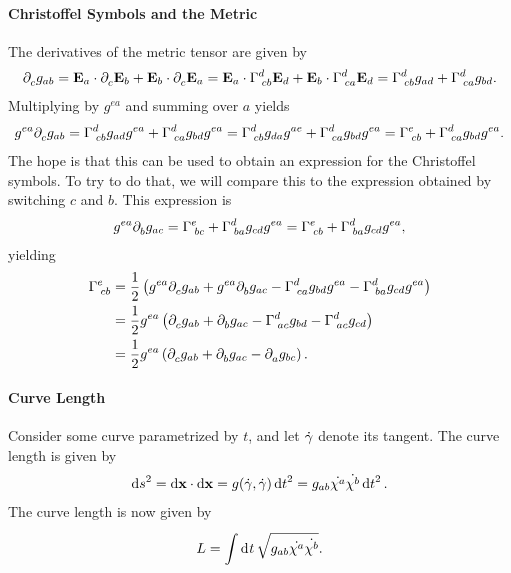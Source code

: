 \paragraph{Christoffel Symbols and the Metric}
The derivatives of the metric tensor are given by
\begin{align*}
	\partial^{}_{c}g_{ab} = \vb{E}_{a}\cdot\partial^{}_{c}\vb{E}_{b} + \vb{E}_{b}\cdot\partial^{}_{c}\vb{E}_{a} = \vb{E}_{a}\cdot\Gamma^{d}_{\;cb}\vb{E}_{d} + \vb{E}_{b}\cdot\Gamma^{d}_{\;ca}\vb{E}_{d} = \Gamma^{d}_{\;cb}g_{ad} + \Gamma^{d}_{\;ca}g_{bd}.
\end{align*}
Multiplying by $g^{ea}$ and summing over $a$ yields
\begin{align*}
	g^{ea}\partial^{}_{c}g_{ab} = \Gamma^{d}_{\;cb}g_{ad}g^{ea} + \Gamma^{d}_{\;ca}g_{bd}g^{ea} = \Gamma^{d}_{\;cb}g_{da}g^{ae} + \Gamma^{d}_{\;ca}g_{bd}g^{ea} = \Gamma^{e}_{\;cb} + \Gamma^{d}_{\;ca}g_{bd}g^{ea}.
\end{align*}
The hope is that this can be used to obtain an expression for the Christoffel symbols. To try to do that, we will compare this to the expression obtained by switching $c$ and $b$. This expression is
\begin{align*}
	g^{ea}\partial^{}_{b}g_{ac} = \Gamma^{e}_{\;bc} + \Gamma^{d}_{\;ba}g_{cd}g^{ea} = \Gamma^{e}_{\;cb} + \Gamma^{d}_{\;ba}g_{cd}g^{ea},
\end{align*}
yielding
\begin{align*}
	\Gamma^{e}_{\;cb} &= \frac{1}{2}\left(g^{ea}\partial^{}_{c}g_{ab} + g^{ea}\partial^{}_{b}g_{ac} - \Gamma^{d}_{\;ca}g_{bd}g^{ea} - \Gamma^{d}_{\;ba}g_{cd}g^{ea}\right) \\
	                &= \frac{1}{2}g^{ea}\left(\partial^{}_{c}g_{ab} + \partial^{}_{b}g_{ac} - \Gamma^{d}_{\;ac}g_{bd} - \Gamma^{d}_{\;ac}g_{cd}\right) \\
	                &= \frac{1}{2}g^{ea}\left(\partial^{}_{c}g_{ab} + \partial^{}_{b}g_{ac} - \partial^{}_{a}g_{bc}\right).
\end{align*}

\paragraph{Curve Length}
Consider some curve parametrized by $t$, and let $\dot{\vb{\gamma}}$ denote its tangent. The curve length is given by
\begin{align*}
	\dd{s}^{2} = \dd{\vb{x}}\cdot\dd{\vb{x}} = g(\dot{\vb{\gamma}}, \dot{\vb{\gamma}})\dd{t}^{2} = g_{ab}\dot{\chi^{a}}\dot{\chi^{b}}\dd{t}^{2}.
\end{align*}
The curve length is now given by
\begin{align*}
	L = \int\limits_{}^{}\dd[]{t}\sqrt{g_{ab}\dot{\chi^{a}}\dot{\chi^{b}}}.
\end{align*}

